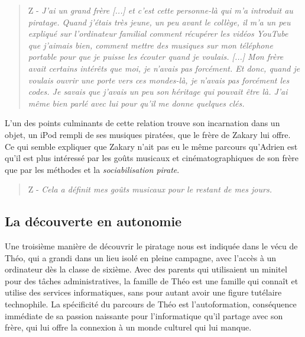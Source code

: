 \begin{quote}
    Z - \textit{J'ai un grand frère [...] et c'est cette personne-là qui m'a introduit au piratage. Quand j'étais très jeune, un peu avant le collège, il m'a un peu expliqué sur l'ordinateur familial comment récupérer les vidéos YouTube que j'aimais bien, comment mettre des musiques sur mon téléphone portable pour que je puisse les écouter quand je voulais. [...] Mon frère avait certains intérêts que moi, je n'avais pas forcément. Et donc, quand je voulais ouvrir une porte vers ces mondes-là, je n'avais pas forcément les codes. Je savais que j'avais un peu son héritage qui pouvait être là. J'ai même bien parlé avec lui pour qu'il me donne quelques clés.}
\end{quote}

L'un des points culminants de cette relation trouve son incarnation dans un objet, un iPod rempli de ses musiques piratées, que le frère de Zakary lui offre. Ce qui semble expliquer que Zakary n'ait pas eu le même parcours qu'Adrien est qu'il est plus intéressé par les goûts musicaux et cinématographiques de son frère que par les méthodes et la \textit{sociabilisation pirate}.
    \begin{quote}
        Z - \textit{Cela a définit mes goûts musicaux pour le restant de mes jours.}
    \end{quote}

\subsection*{La découverte en autonomie}

Une troisième manière de découvrir le piratage nous est indiquée dans le vécu de Théo, qui a grandi dans un lieu isolé en pleine campagne, avec l'accès à un ordinateur dès la classe de sixième. Avec des parents qui utilisaient un minitel pour des tâches administratives, la famille de Théo est une famille qui connaît et utilise des services informatiques, sans pour autant avoir une figure tutélaire technophile. La spécificité du parcours de Théo est l'autoformation, conséquence immédiate de sa passion naissante pour l'informatique qu'il partage avec son frère, qui lui offre la connexion à un monde culturel qui lui manque.

